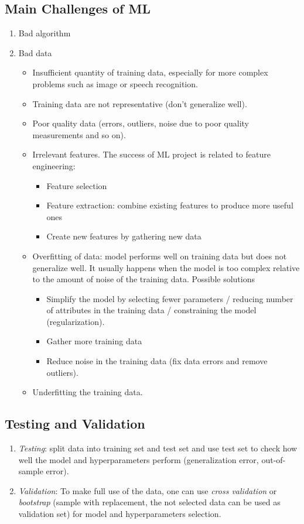 \documentclass[12pt,oneside,a4paper]{article}
\numberwithin{equation}{section}
\begin{document}
\subsection{Main Challenges of ML}
\begin{enumerate}
\item Bad algorithm

\item Bad data 
\begin{itemize}
\item Insufficient quantity of training data, especially for more complex problems such as image or speech recognition.
\item Training data are not representative (don't generalize well).
\item Poor quality data (errors, outliers, noise due to poor quality measurements and so on).
\item Irrelevant features. The success of ML project is related to feature engineering: 
\begin{itemize}
\item Feature selection 
\item Feature extraction: combine existing features to produce more useful ones 
\item Create new features by gathering new data
\end{itemize}
\item Overfitting of data: model performs well on training data but does not generalize well. It usually happens when the model is too complex relative to the amount of noise of the training data. Possible solutions 
\begin{itemize}
\item Simplify the model by selecting fewer parameters / reducing number of attributes in the training data / constraining the model (regularization).
\item Gather more training data 
\item Reduce noise in the training data (fix data errors and remove outliers).
\end{itemize}
\item Underfitting the training data.
\end{itemize}
\end{enumerate}
\subsection{Testing and Validation}
\begin{enumerate}
\item \emph{Testing}: split data into training set and test set and use test set to check how well the model and hyperparameters perform (generalization error, out-of-sample error). 

\item \emph{Validation}: To make full use of the data, one can use \emph{cross validation} or \emph{bootstrap} (sample with replacement, the not selected data can be used as validation set) for model and hyperparameters selection.
\end{enumerate}
\end{document}
